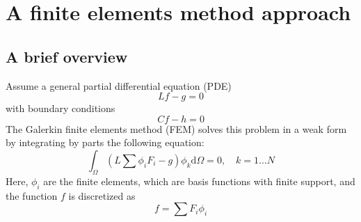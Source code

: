 \section{A finite elements method approach}

\subsection{A brief overview}

Assume a general partial differential equation (PDE)
\begin{equation}
Lf - g = 0
\end{equation}
with boundary conditions
\begin{equation}
Cf - h = 0
\end{equation}
The Galerkin finite elements method (FEM) solves this problem
in a weak form by integrating by parts the following equation:
\begin{equation}
\int_\Omega  {\left( {L\sum {{\phi _i}{F_i} - g} } \right){\phi _k}{\text{d}}\Omega }  = 0,\quad k = 1 \ldots N
\end{equation}
Here, $\phi_i$ are the finite elements, which are basis functions with
finite support, and the function $f$ is discretized as
\begin{equation}
f = \sum {{F_i}{\phi _i}} 
\end{equation}

